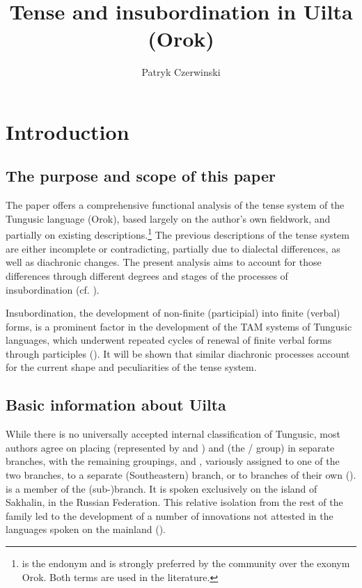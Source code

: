 \documentclass[output=paper,colorlinks,citecolor=brown]{langscibook}
\author{Patryk Czerwinski\affiliation{University of Mainz}}
\title{Tense and insubordination in Uilta (Orok)}
\begin{document}
\maketitle

\section{Introduction}\label{Section3.1}

\subsection{The purpose and scope of this paper}\label{Section3.1.1}

The paper offers a comprehensive functional analysis of the tense system of the Tungusic language  (Orok), based largely on the author’s own fieldwork, and partially on existing descriptions.\footnote{ is the endonym and is strongly preferred by the community over the exonym Orok. Both terms are used in the literature.} The previous descriptions of the  tense system are either incomplete or contradicting, partially due to dialectal differences, as well as diachronic changes. The present analysis aims to account for those differences through different degrees and stages of the processes of insubordination (cf. \citealt{Evans_2007}).

Insubordination, the development of non-finite (participial) into finite (verbal) forms, is a prominent factor in the development of the TAM systems of Tungusic languages, which underwent repeated cycles of renewal of finite verbal forms through participles (\citealt{Malchukov_2013}). It will be shown that similar diachronic processes account for the current shape and peculiarities of the  tense system.


\subsection{Basic information about Uilta}\label{Section3.1.2}

While there is no universally accepted internal classification of Tungusic, most authors agree on placing  (represented by  and ) and  (the / group) in separate branches, with the remaining groupings,  and , variously assigned to one of the two branches, to a separate (Southeastern) branch, or to branches of their own (\citealt{Whaley_Oskolskaya_2020}).  is a member of the  (sub-)branch. It is spoken exclusively on the island of Sakhalin, in the Russian Federation. This relative isolation from the rest of the family led to the development of a number of innovations not attested in the languages spoken on the mainland (\citealt{Pevnov_2016}).
\end{document}
